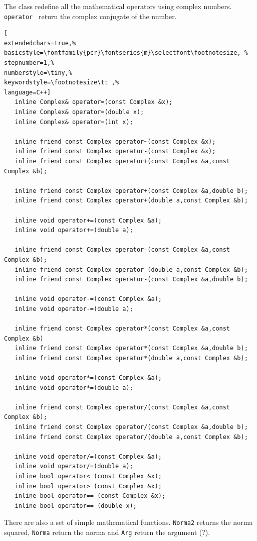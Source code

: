 The class redefine all the mathematical operators using complex numbers. \texttt{operator~} return the complex conjugate of the number.

\begin{lstlisting}[
extendedchars=true,%
basicstyle=\fontfamily{pcr}\fontseries{m}\selectfont\footnotesize, %
stepnumber=1,%
numberstyle=\tiny,%
keywordstyle=\footnotesize\tt ,%
language=C++]
   inline Complex& operator=(const Complex &x);
   inline Complex& operator=(double x);
   inline Complex& operator=(int x);

   inline friend const Complex operator~(const Complex &x);
   inline friend const Complex operator-(const Complex &x);
   inline friend const Complex operator+(const Complex &a,const Complex &b);

   inline friend const Complex operator+(const Complex &a,double b);
   inline friend const Complex operator+(double a,const Complex &b);

   inline void operator+=(const Complex &a);
   inline void operator+=(double a);

   inline friend const Complex operator-(const Complex &a,const Complex &b);
   inline friend const Complex operator-(double a,const Complex &b);
   inline friend const Complex operator-(const Complex &a,double b);

   inline void operator-=(const Complex &a);
   inline void operator-=(double a);

   inline friend const Complex operator*(const Complex &a,const Complex &b)
   inline friend const Complex operator*(const Complex &a,double b);
   inline friend const Complex operator*(double a,const Complex &b);

   inline void operator*=(const Complex &a);
   inline void operator*=(double a);

   inline friend const Complex operator/(const Complex &a,const Complex &b);
   inline friend const Complex operator/(const Complex &a,double b);
   inline friend const Complex operator/(double a,const Complex &b);

   inline void operator/=(const Complex &a);
   inline void operator/=(double a);
   inline bool operator< (const Complex &x);
   inline bool operator> (const Complex &x);
   inline bool operator== (const Complex &x);
   inline bool operator== (double x);
\end{lstlisting}

There are also a set of simple mathematical functions. \texttt{Norma2} returns the norma squared, \texttt{Norma} return the norma and \texttt{Arg} return the argument (?).

